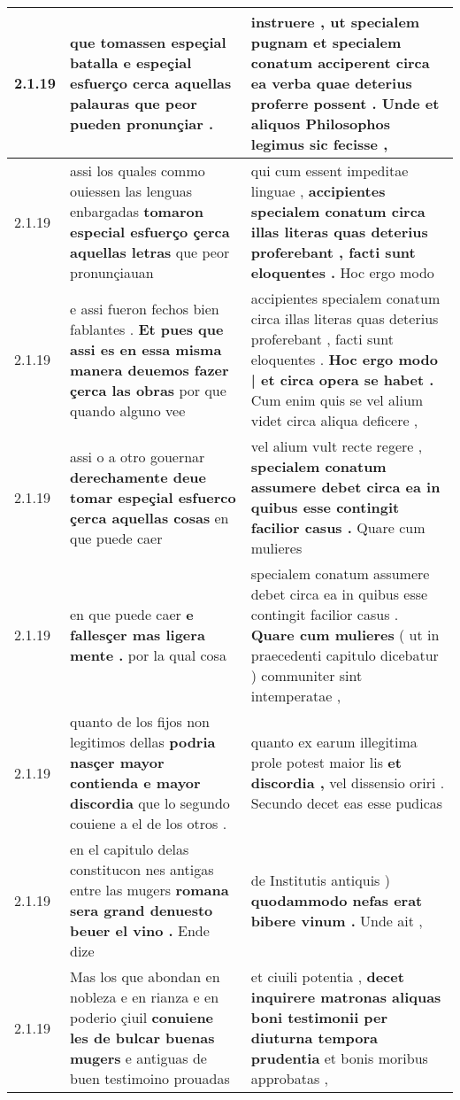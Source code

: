 \begin{tabular}{|p{1cm}|p{6.5cm}|p{6.5cm}|}
2.1.19 & que tomassen espeçial batalla \textbf{ e espeçial esfuerço cerca aquellas palauras } que peor pueden pronunçiar . & instruere , \textbf{ ut specialem pugnam et specialem conatum acciperent circa ea verba quae deterius proferre possent . } Unde et aliquos Philosophos legimus sic fecisse , \\\hline
2.1.19 & assi los quales commo ouiessen las lenguas enbargadas \textbf{ tomaron especial esfuerço çerca aquellas letras } que peor pronunçiauan & qui cum essent impeditae linguae , \textbf{ accipientes specialem conatum circa illas literas quas deterius proferebant , facti sunt eloquentes . } Hoc ergo modo \\\hline
2.1.19 & e assi fueron fechos bien fablantes . \textbf{ Et pues que assi es en essa misma manera deuemos fazer çerca las obras } por que quando alguno vee & accipientes specialem conatum circa illas literas quas deterius proferebant , facti sunt eloquentes . \textbf{ Hoc ergo modo | et circa opera se habet . } Cum enim quis se vel alium videt circa aliqua deficere , \\\hline
2.1.19 & assi o a otro gouernar \textbf{ derechamente deue tomar espeçial esfuerco çerca aquellas cosas } en que puede caer & vel alium vult recte regere , \textbf{ specialem conatum assumere debet circa ea in quibus esse contingit facilior casus . } Quare cum mulieres \\\hline
2.1.19 & en que puede caer \textbf{ e fallesçer mas ligera mente . } por la qual cosa & specialem conatum assumere debet circa ea in quibus esse contingit facilior casus . \textbf{ Quare cum mulieres } ( ut in praecedenti capitulo dicebatur ) communiter sint intemperatae , \\\hline
2.1.19 & quanto de los fijos non legitimos dellas \textbf{ podria nasçer mayor contienda e mayor discordia } que lo segundo couiene a el de los otros . & quanto ex earum illegitima prole potest maior lis \textbf{ et discordia , } vel dissensio oriri . Secundo decet eas esse pudicas \\\hline
2.1.19 & en el capitulo delas constitucon nes antigas entre las mugers \textbf{ romana sera grand denuesto beuer el vino . } Ende dize & de Institutis antiquis ) \textbf{ quodammodo nefas erat bibere vinum . } Unde ait , \\\hline
2.1.19 & Mas los que abondan en nobleza e en rianza e en poderio çiuil \textbf{ conuiene les de bulcar buenas mugers } e antiguas de buen testimoino prouadas & et ciuili potentia , \textbf{ decet inquirere matronas aliquas boni testimonii per diuturna tempora prudentia } et bonis moribus approbatas , \\\hline

\end{tabular}
